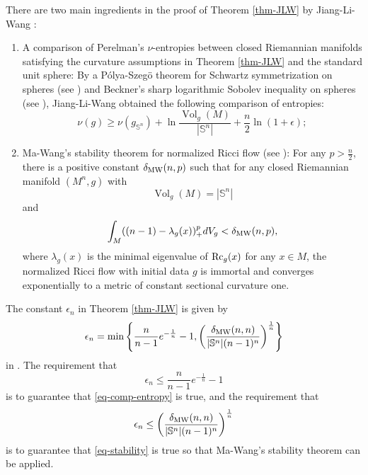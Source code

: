 \documentclass[12pt]{amsart}
\def\Rc{\mbox{Rc}}
\def\sph{\mathbb{S}}
\def\e{\epsilon}
\def\Rc{{\rm Rc}}
\theoremstyle{definition}
\theoremstyle{remark}
\numberwithin{equation}{section}
\begin{document}
There are two main ingredients in the proof of Theorem \ref{thm-JLW} by Jiang-Li-Wang \cite{JLW}:
\begin{enumerate}
\item A comparison of Perelman's $\nu$-entropies between closed Riemannian manifolds satisfying the curvature assumptions in Theorem \ref{thm-JLW} and the standard unit sphere: By a P\'olya-Szeg\"o theorem for Schwartz symmetrization on spheres (see \cite{MS}) and Beckner's sharp logarithmic Sobolev inequality on spheres (see \cite{Be}), Jiang-Li-Wang obtained the following comparison of entropies:
\begin{equation}\label{eq-comp-entropy}
\nu(g)\geq \nu(g_{\sph^n})+\ln\frac{\operatorname{Vol}_g(M)}{|\sph^n|}+\frac{n}{2}\ln(1+\e);
\end{equation}
\item Ma-Wang's stability theorem for  normalized Ricci flow (see \cite{MW}): For any $p>\frac{n}{2}$, there is a positive constant $\delta_{\rm MW}(n,p)$ such that for any closed Riemannian manifold $(M^n,g)$ with 
\begin{equation}
\operatorname{Vol}_g(M)=|\sph^n|
\end{equation}
and
\begin{equation}\label{eq-stability}
\int_M((n-1)-\lambda_g(x))_+^pdV_g<\delta_{\rm MW}(n,p),
\end{equation} 
where $\lambda_g(x)$ is the minimal eigenvalue of $\Rc_g(x)$ for any $x\in M$, the normalized Ricci flow with initial data $g$ is immortal and converges exponentially to a metric of constant sectional curvature one.
\end{enumerate}
The constant $\e_n$ in Theorem \ref{thm-JLW}  is given by 
\begin{equation}\label{eq-e-n}
\e_n=\min\left\{\frac{n}{n-1}e^{-\frac1n}-1, \left(\frac{\delta_{\rm MW}(n,n)}{|\sph^n|(n-1)^n}\right)^\frac1n\right\}
\end{equation}
in \cite{JLW}. The requirement that 
$$\e_n\leq\frac{n}{n-1}e^{-\frac1n}-1$$ 
is to guarantee that \eqref{eq-comp-entropy} is true, and the requirement that $$\e_n\leq\left(\frac{\delta_{\rm MW}(n,n)}{|\sph^n|(n-1)^n}\right)^\frac1n$$
is to guarantee that \eqref{eq-stability} is true so that Ma-Wang's stability theorem can be applied. 
\end{document}
